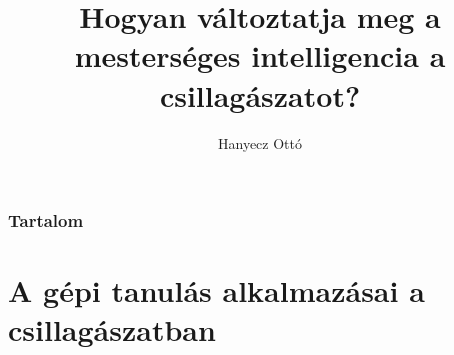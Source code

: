 \documentclass{beamer}
\title[MI a csillagászatban]{Hogyan változtatja meg a mesterséges intelligencia a csillagászatot?}
\author{Hanyecz Ottó}
\date[Polaris, \today]
{
\begin{columns}
    \begin{column}{0.9\textwidth}
        \centering
        \begin{Large}
            Polaris Csillagvizsgáló \\
        \end{Large}
        \vspace*{0.5cm}
        Budapest \\
        \vspace*{0.5cm}
        2020. október 27.
    \end{column}
\end{columns}
}
\begin{document}
\begin{frame}
    \titlepage
\end{frame}

\begin{frame}
    \frametitle{Tartalom}
    \tableofcontents
\end{frame}



\section{A gépi tanulás alkalmazásai a csillagászatban}






\end{document}
